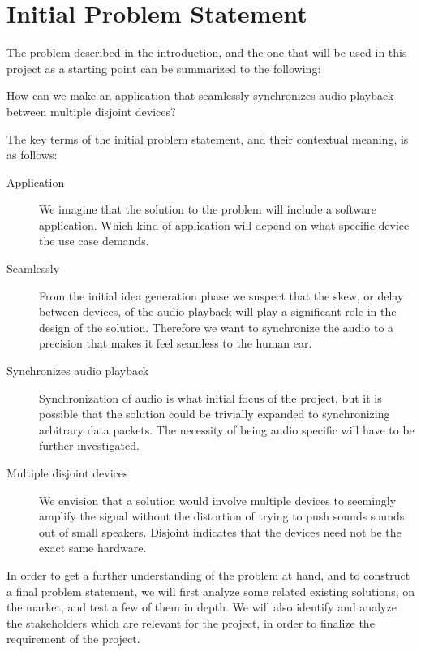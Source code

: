 \section{Initial Problem Statement}\label{sec:initial_problem}

The problem described in the introduction, and the one that will be used
in this project as a starting point can be summarized to the following:

\begin{problemstatement}
	How can we make an application that seamlessly synchronizes audio
	playback between multiple disjoint devices?
\end{problemstatement}

The key terms of the initial problem statement, and their contextual meaning,
is as follows:
\begin{description}
	\item[Application] We
		imagine that the solution to the problem will include a software
		application. Which kind of application will depend on what specific
		device the use case demands.
	\item[Seamlessly] From the initial idea generation phase we suspect
		that the skew, or delay between devices, of the audio playback will
		play a significant role in the design of the solution. Therefore we
		want to synchronize the audio to a precision that makes it feel
		seamless to the human ear.
	\item[Synchronizes audio playback] Synchronization of audio is what initial
		focus of the project, but it is possible that the solution could be
		trivially expanded to synchronizing arbitrary data packets. The
		necessity of being audio specific will have to be further investigated.
	\item[Multiple disjoint devices] We envision that
		a solution would involve multiple devices to seemingly amplify the
		signal without the distortion of trying to push sounds sounds out of
		small speakers. Disjoint indicates that the devices need not be the 
		exact same hardware. 
\end{description}

In order to get a further understanding of the problem at hand, and to
construct a final problem statement, we will first analyze some related
existing solutions, on the market, and test a few of them in depth. We will
also identify and analyze the stakeholders which are relevant for the project,
in order to finalize the requirement of the project.
